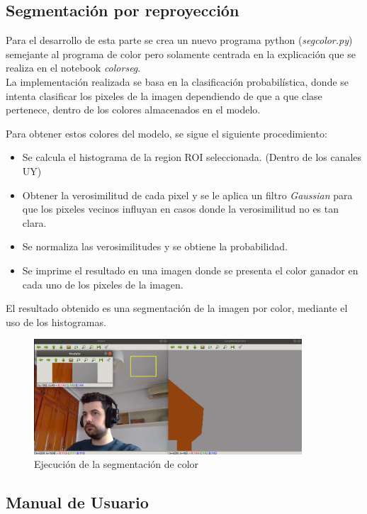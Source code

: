 \documentclass[a4paper]{article} %
\begin{document}
\subsection{Segmentación por reproyección}

Para el desarrollo de esta parte se crea un nuevo programa python (\textit{segcolor.py}) semejante al programa de color pero solamente centrada en la explicación que se realiza en el notebook \textit{colorseg}.\\

La implementación realizada se basa en la clasificación probabilística, donde se intenta clasificar los pixeles de la imagen dependiendo de que a que clase pertenece, dentro de los colores almacenados en el modelo.

Para obtener estos colores del modelo, se sigue el siguiente procedimiento:
\begin{itemize}
	\item Se calcula el histograma de la region ROI seleccionada. (Dentro de los canales UY)
	\item Obtener la verosimilitud de cada pixel y se le aplica un filtro \textit{Gaussian} para que los pixeles vecinos influyan en casos donde la verosimilitud no es tan clara.
	\item Se normaliza las verosimilitudes y se obtiene la probabilidad.
	\item Se imprime el resultado en una imagen donde se presenta el color ganador en cada uno de los pixeles de la imagen.
\end{itemize}

El resultado obtenido es una segmentación de la imagen por color, mediante el uso de los histogramas.

\begin{figure}[htp]
	\centering
	\includegraphics[width=10cm]{imagenes/seg.png}
	\caption{Ejecución de la segmentación de color}
	\label{fig:seg}
\end{figure}

\subsection*{Manual de Usuario}
\end{document}
